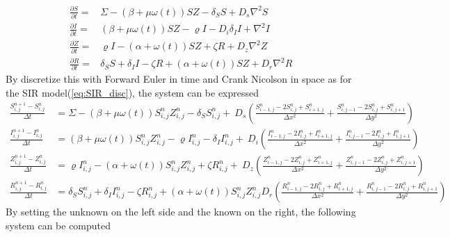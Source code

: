\documentclass[%
twoside,                 %
final,                   %
10pt]{article}
\begin{document}
\begin{align*} \label{eq:seland_model}
\frac{\partial S}{\partial t} =& \Sigma -(\beta+\mu \omega(t))SZ - \delta_SS +D_s\nabla^2 S \\
\frac{\partial I}{\partial t} =& (\beta+\mu \omega(t))SZ - \varrho I - D_i\delta_II+\nabla^2 I\\
\frac{\partial Z}{\partial t} =& \varrho I- (\alpha+\omega(t))SZ + \zeta R+D_z\nabla^2 Z\\
\frac{\partial R}{\partial t} =& \delta_SS +\delta_II -\zeta R + (\alpha+\omega(t))SZ+D_r\nabla^2 R 
\end{align*}
By discretize this with Forward Euler in time and Crank Nicolson in space as for the SIR model(\ref{eq:SIR_disc}), the system can be expressed
\begin{equation} \label{eq:SIZR_disc}
	\begin{aligned}
    \frac{S^{n+1}_{i,j}-S^n_{i,j}}{\Delta t} &= \Sigma - (\beta+\mu \omega(t))S^{n}_{i,j}Z^{n}_{i,j}- \delta_S S^{n}_{i,j}+\
        D_s\left(\frac{S^{n}_{i-1,j}-2S^{n}_{i,j}+S^{n}_{i+1,j}}{\Delta x^2}+\frac{S^{n}_{i,j-1}-2S^{n}_{i,j}+S^{n}_{i,j+1}}{\Delta y^2}\right) \\
    \frac{I^{n+1}_{i,j}-I^n_{i,j}}{\Delta t} &= (\beta+\mu \omega(t))S^{n}_{i,j}Z^{n}_{i,j}-\varrho I^{n}_{i,j}- \delta_I I^{n}_{i,j}+\
        D_i\left(\frac{I^{n}_{i-1,j}-2I^{n}_{i,j}+I^{n}_{i+1,j}}{\Delta x^2}+\frac{I^{n}_{i,j-1}-2I^{n}_{i,j}+I^{n}_{i,j+1}}{\Delta y^2}\right) \\
    \frac{Z^{n+1}_{i,j}-Z^n_{i,j}}{\Delta t} &= \varrho I^{n}_{i,j}-(\alpha+\omega(t))S^{n}_{i,j}Z^{n}_{i,j}+ \zeta R^{n}_{i,j}+\
        D_z\left(\frac{Z^{n}_{i-1,j}-2Z^{n}_{i,j}+Z^{n}_{i+1,j}}{\Delta x^2}+\frac{Z^{n}_{i,j-1}-2Z^{n}_{i,j}+Z^{n}_{i,j+1}}{\Delta y^2}\right) \\
    \frac{R^{n+1}_{i,j}-R^n_{i,j}}{\Delta t} &= \delta_S S^{n}_{i,j}+\delta_I I^{n}_{i,j}-\zeta R^{n}_{i,j}+(\alpha+\omega(t))S^{n}_{i,j}Z^{n}_{i,j}
        D_r\left(\frac{R^{n}_{i-1,j}-2R^{n}_{i,j}+R^{n}_{i+1,j}}{\Delta x^2}+\frac{R^{n}_{i,j-1}-2R^{n}_{i,j}+R^{n}_{i,j+1}}{\Delta y^2}\right) 
	\end{aligned}
\end{equation}
By setting the unknown on the left side and the known on the right, the following system can be computed
\end{document}
